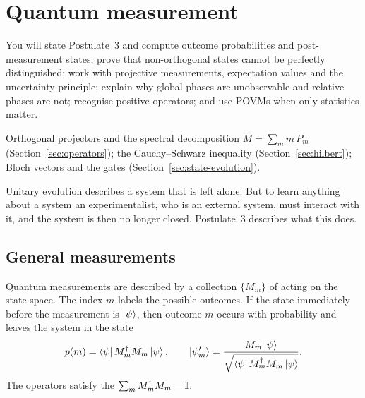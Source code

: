 \section{Quantum measurement}\label{sec:measurement}

\begin{objectives}
  You will state Postulate~3 and compute outcome probabilities and post-measurement states; prove that non-orthogonal states cannot be perfectly distinguished; work with projective measurements, expectation values and the uncertainty principle; explain why global phases are unobservable and relative phases are not;
  recognise positive operators; and use POVMs when only statistics matter.
\end{objectives}

\begin{recall}
  Orthogonal projectors and the spectral decomposition $M=\sum_mm\,P_m$ (Section~\ref{sec:operators}); the Cauchy--Schwarz inequality (Section~\ref{sec:hilbert}); Bloch vectors and the gates (Section~\ref{sec:state-evolution}).
\end{recall}

Unitary evolution describes a system that is left alone. But to learn anything about a system an experimentalist, who is an external system, must interact with it, and the system is then no longer closed. Postulate~3 describes what this does.

\subsection{General measurements}

\begin{postulate}[Measurement]\label{post:measurement}
  Quantum measurements are described by a collection $\{M_m\}$ of  acting on the state space. The index $m$ labels the possible outcomes.
  If the state immediately before the measurement is $\left|\psi\right\rangle$, then outcome $m$ occurs with probability and leaves the system in the state
  \[
    p(m)=\left\langle\psi\right| M_m^\dagger M_m\left|\psi\right\rangle,\qquad
    \left|\psi'_m\right\rangle=\frac{M_m\left|\psi\right\rangle}{\sqrt{\left\langle\psi\right| M_m^\dagger M_m\left|\psi\right\rangle}} .
  \]
  The operators satisfy the  $\sum_mM_m^\dagger M_m=\mathbb{I}$.
\end{postulate}

